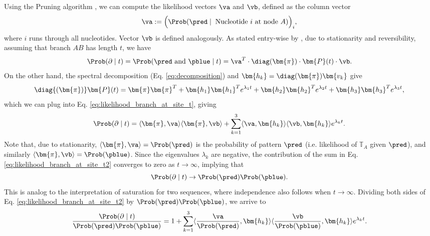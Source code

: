 Using the Pruning algorithm , we can compute the likelihood vectors $\va$ and $\vb$, defined as the column vector
 \begin{equation}
 \va := \Big(\Prob(\pred \mid \; \text{Nucleotide $i$ at node $A$})\Big)_i,
 \end{equation}
where $i$ runs through all nucleotides. Vector $\vb$ is defined analogously. As stated entry-wise by , due to stationarity and reversibility, assuming that branch $AB$ has length $t$, we have \begin{equation} \label{eq:likelihood_branch_at_site_t} \Prob(\partial \mid t) =  \Prob(\pred \text{ and } \pblue \mid t) = \va^T \cdot\diag (\bm{\pi})\cdot \bm{P}(t)\cdot \vb.
\end{equation}
On the other hand, the spectral decomposition (Eq. \eqref{eq:decomposition}) and ${\bm{h_k} = \diag (\bm{\pi})\bm{v_k}}$ give
\begin{equation}\label{eq:decomposition_syme}
\diag{(\bm{\pi})}\bm{P}(t) = \bm{\pi}\bm{\pi}^T + \bm{h_1} \bm{h_1}^T e^{\lambda_1t} + \bm{h_2} \bm{h_2}^T e^{\lambda_2t} + \bm{h_3} \bm{h_3}^T e^{\lambda_3t},
\end{equation}
which we can plug into Eq. \eqref{eq:likelihood_branch_at_site_t}, giving
\begin{equation} \label{eq:likelihood_branch_at_site_t2} \Prob(\partial \mid t) = \langle \bm{\pi}, \va\rangle \langle \bm{\pi}, \vb\rangle  + \sum_{k =1}^3\langle \va, \bm{h_k}\rangle \langle \vb,  \bm{h_k} \rangle e^{\lambda_k t}.
\end{equation}
Note that, due to stationarity, ${\langle \bm{\pi},  \va \rangle = \Prob(\pred) }$ is the probability of pattern $\pred$ (i.e. likelihood of $\mathbb{T}_A$ given $\pred$), and similarly ${\langle \bm{\pi}, \vb \rangle= \Prob(\pblue)}$. Since the eigenvalues $\lambda_k$ are negative, the contribution of the sum in Eq. \eqref{eq:likelihood_branch_at_site_t2} converges to zero as $t\to\infty$, implying that
\begin{equation}
 \label{eq:independence}
 \Prob(\partial \mid t) \to \Prob(\pred)\Prob(\pblue).
\end{equation}
This is analog to the interpretation of saturation for two sequences, where independence also follows when $t\to\infty$. Dividing both sides of Eq. \eqref{eq:likelihood_branch_at_site_t2} by $\Prob(\pred)\Prob(\pblue)$, we arrive to
\begin{equation} \label{eq:likelihood_branch_at_site_t33} \frac{\Prob(\partial \mid t)}{\Prob(\pred)\Prob(\pblue)} =  1 + \sum_{k=1}^3 \langle \frac{\va}{\Prob(\pred)},\bm{h_k}\rangle \langle \frac{\vb}{\Prob(\pblue)}, \bm{h_k} \rangle e^{\lambda_k t}.
\end{equation}
 
